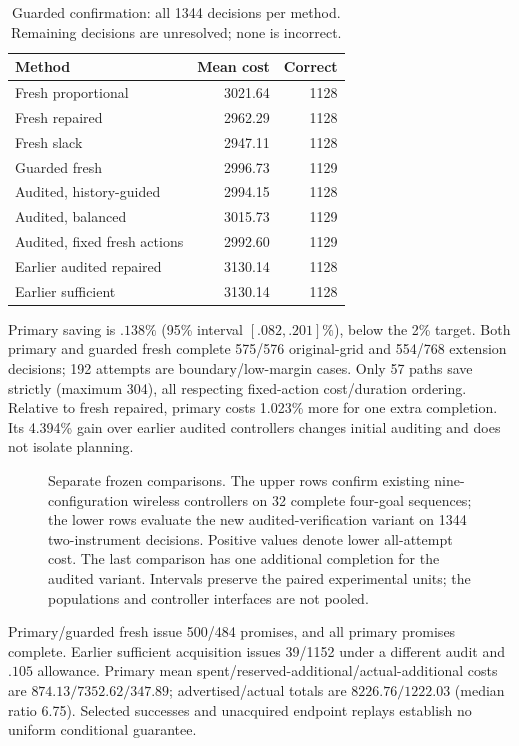 \begin{table}[t]
\centering\small
\caption{Guarded confirmation: all 1344 decisions per method. Remaining decisions are unresolved; none is incorrect.}
\label{tab:v37-methods}
\begin{tabular}{@{}lrr@{}}
\toprule
Method&Mean cost&Correct\\
\midrule
Fresh proportional&3021.64&1128\\
Fresh repaired&2962.29&1128\\
Fresh slack&2947.11&1128\\
Guarded fresh&2996.73&1129\\
Audited, history-guided&2994.15&1128\\
Audited, balanced&3015.73&1129\\
Audited, fixed fresh actions&2992.60&1129\\
Earlier audited repaired&3130.14&1128\\
Earlier sufficient&3130.14&1128\\
\bottomrule
\end{tabular}
\end{table}
Primary saving is $.138\%$ (95\% interval $[.082,.201]\%$), below the 2\% target. Both primary and guarded fresh complete 575/576 original-grid and 554/768 extension decisions; 192 attempts are boundary/low-margin cases. Only 57 paths save strictly (maximum 304), all respecting fixed-action cost/duration ordering. Relative to fresh repaired, primary costs 1.023\% more for one extra completion. Its 4.394\% gain over earlier audited controllers changes initial auditing and does not isolate planning.
\begin{figure}[t]
\centering
\resizebox{\columnwidth}{!}{}
\caption{Separate frozen comparisons. The upper rows confirm existing nine-configuration wireless controllers on 32 complete four-goal sequences; the lower rows evaluate the new audited-verification variant on 1344 two-instrument decisions. Positive values denote lower all-attempt cost. The last comparison has one additional completion for the audited variant. Intervals preserve the paired experimental units; the populations and controller interfaces are not pooled.}
\label{fig:v37-costs}
\end{figure}
Primary/guarded fresh issue 500/484 promises, and all primary promises complete. Earlier sufficient acquisition issues 39/1152 under a different audit and $.105$ allowance. Primary mean spent/reserved-additional/actual-additional costs are $874.13/7352.62/347.89$; advertised/actual totals are $8226.76/1222.03$ (median ratio 6.75). Selected successes and unacquired endpoint replays establish no uniform conditional guarantee.
